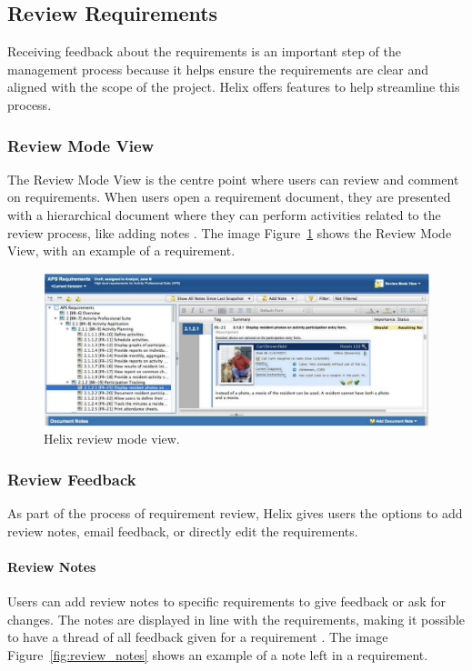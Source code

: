 \subsection{Review Requirements}
Receiving feedback about the requirements is an important step 
of the management process because it helps ensure the requirements 
are clear and aligned with the scope of the project. 
Helix offers features to help streamline this process.

\subsubsection{Review Mode View}
The Review Mode View is the centre point where users 
can review and comment on requirements. When users open 
a requirement document, they are presented with a hierarchical 
document where they can perform activities related to the review 
process, like adding notes \cite{perforce_2024}.
The image Figure~\ref{fig:review_mode} shows the Review Mode View, with an example of a requirement.

\begin{figure}[htbp]
    \centering
    \includegraphics[width=\linewidth]{images/review-mode-view}
    \caption{Helix review mode view.}
    \label{fig:review_mode}
\end{figure}

\subsubsection{Review Feedback}
As part of the process of requirement review, 
Helix gives users the options to add review notes, 
email feedback, or directly edit the requirements.

\paragraph{Review Notes}
Users can add review notes to specific requirements to give 
feedback or ask for changes. The notes are displayed in 
line with the requirements, making it possible to have a 
thread of all feedback given for a requirement \cite{perforce_2024}.
The image Figure~\ref{fig:review_notes} shows an example of a note left in a requirement.

